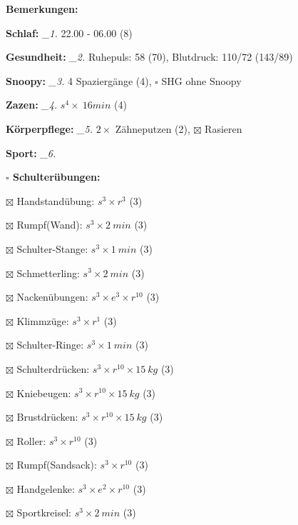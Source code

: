 \documentclass[10pt,a4paper]{article}
\newcommand\prop[1] {{\color {alizarin} {\bf #1}}}             %
\newcommand\mand[1] {{\color {burntorange} {\bf #1}}}          %
\newcommand\topspace{\vskip -15pt \hskip 20pt}
\newcommand\n[1] { {\sl #1.} \hskip 5pt }
\begin{document}
\begin{mdframed}[style=daystyle]
  \begin{labeling}{{\mand {Bemerkungen:}}}
    \setlength\itemsep{-3pt}
  \item[{\mand {Schlaf:}}]       \n{\_1} 22.00 - 06.00 (8)
  \item[{\mand {Gesundheit:}}]   \n{\_2} Ruhepuls: 58 (70), Blutdruck: 110/72 (143/89)
  \item[{\mand {Snoopy:}}]       \n{\_3} 4 Spaziergänge (4), $\square$ SHG ohne Snoopy
  \item[{\mand {Zazen:}}]        \n{\_4} $s^4 \times\ 16 min$ (4)
  \item[{\mand {Körperpflege:}}] \n{\_5} $2 \times$ Zähneputzen (2), $\boxtimes$ Rasieren
  \item[{\mand {Sport:}}]        \n{\_6}
    \topspace
    \begin{minipage}{0.75\textwidth}  
      \begin{labeling}{\prop {$\square$ {Schulterübungen:}}} 
        \setlength\itemsep{-3pt}
      \item[$\boxtimes$ Handstandübung:]  $s^3 \times r^{3}$ (3)
      \item[$\boxtimes$ Rumpf(Wand):]     $s^3 \times 2\ min$ (3)
      \item[$\boxtimes$ Schulter-Stange:] $s^3 \times 1\ min$ (3)
      \item[$\boxtimes$ Schmetterling:]   $s^3 \times 2\ min$ (3)
      \item[$\boxtimes$ Nackenübungen:]   $s^3 \times e^3 \times r^{10}$ (3)
      \item[$\boxtimes$ Klimmzüge:]       $s^3 \times r^1$ (3)
      \item[$\boxtimes$ Schulter-Ringe:]  $s^3 \times 1\ min$ (3)
      \item[$\boxtimes$ Schulterdrücken:] $s^3 \times r^{10} \times 15\ kg$ (3)
      \item[$\boxtimes$ Kniebeugen:]      $s^3 \times r^{10} \times 15\ kg$ (3)
      \item[$\boxtimes$ Brustdrücken:]    $s^3 \times r^{10} \times 15\ kg$ (3)
      \item[$\boxtimes$ Roller:]          $s^3 \times r^{10}$ (3)
      \item[$\boxtimes$ Rumpf(Sandsack):] $s^3 \times r^{10}$ (3)
      \item[$\boxtimes$ Handgelenke:]     $s^3 \times e^2 \times r^{10}$ (3)
      \item[$\boxtimes$ Sportkreisel:]    $s^3 \times 2\ min$ (3)

\end{labeling}
\end{minipage}
\end{labeling}
\end{mdframed}
\end{document}
